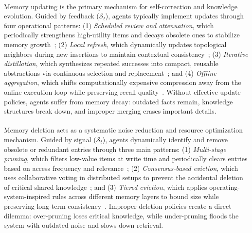\paragraph{} Memory updating is the primary mechanism for self-correction and knowledge evolution. Guided by feedback ($\mathcal{S}_t$), agents typically implement updates through four operational patterns: (1) \emph{Scheduled review and attenuation}, which periodically strengthens high-utility items and decays obsolete ones to stabilize memory growth~\citep{liang2025selfevolvingagentsreflectivememoryaugmented}; (2) \emph{Local refresh}, which dynamically updates topological neighbors during new insertions to maintain contextual consistency~\citep{xu2025amemagenticmemoryllm}; (3) \emph{Iterative distillation}, which synthesizes repeated successes into compact, reusable abstractions via continuous selection and replacement~\citep{suzgun2025dynamiccheatsheettesttimelearning, zhang2025agenticcontextengineeringevolving}; and (4) \emph{Offline aggregation}, which shifts computationally expensive compression away from the online execution loop while preserving recall quality~\citep{fang2025lightmemlightweightefficientmemoryaugmented}. Without effective update policies, agents suffer from memory decay: outdated facts remain, knowledge structures break down, and improper merging erases important details.
 

\paragraph{} Memory deletion acts as a systematic noise reduction and resource optimization mechanism. Guided by signal ($\mathcal{S}_t$), agents dynamically identify and remove obsolete or redundant entries through three main patterns: (1) \emph{Multi-stage pruning}, which filters low-value items at write time and periodically clears entries based on access frequency and relevance~\citep{zhang2025mlcagentcognitivemodelbased}; (2) \emph{Consensus-based eviction}, which uses collaborative voting in distributed setups to prevent the accidental deletion of critical shared knowledge~\citep{bach2025pbftbackedsemanticvotingmultiagent}; and (3) \emph{Tiered eviction}, which applies operating-system-inspired rules across different memory layers to bound size while preserving long-term consistency~\citep{kang2025memory}. Improper deletion policies create a direct dilemma: over-pruning loses critical knowledge, while under-pruning floods the system with outdated noise and slows down retrieval.


